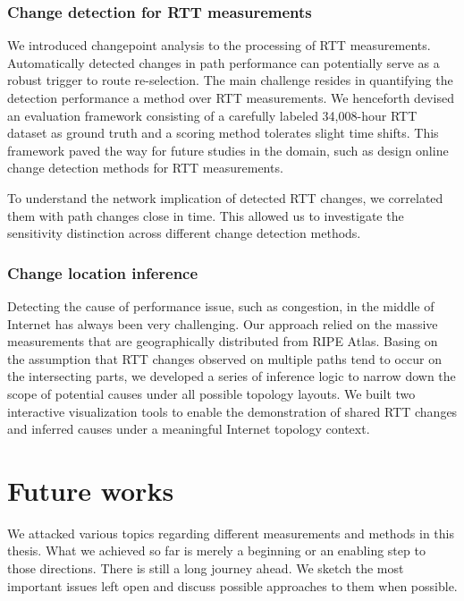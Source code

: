 \subsection{Change detection for RTT measurements}

We introduced changepoint analysis to the processing of RTT measurements.
Automatically detected changes in path performance can potentially serve as a robust trigger to route re-selection.
The main challenge resides in quantifying the detection performance a method over RTT measurements.
We henceforth devised an evaluation framework consisting of a carefully labeled 34,008-hour RTT dataset as ground truth and a scoring method tolerates slight time shifts. This framework paved the way for future studies in the domain, such as design online change detection methods for RTT measurements.

To understand the network implication of detected RTT changes, we correlated them with path changes close in time.
This allowed us to investigate the sensitivity distinction across different change detection methods.

\subsection{Change location inference}
Detecting the cause of performance issue, such as congestion, in the middle of Internet has always been very challenging. 
Our approach relied on the massive measurements that are geographically distributed from RIPE Atlas. Basing on the assumption that RTT changes observed on multiple paths tend to occur on the intersecting parts, we developed a series of inference logic to narrow down the scope of potential causes under all possible topology layouts.
We built two interactive visualization tools to enable the demonstration of shared RTT changes and inferred causes under a meaningful Internet topology context.


\chapter{Future works}
We attacked various topics regarding different measurements and methods in this thesis.
What we achieved so far is merely a beginning or an enabling step to those directions.
There is still a long journey ahead.
We sketch the most important issues left open and discuss possible approaches to them when possible.


